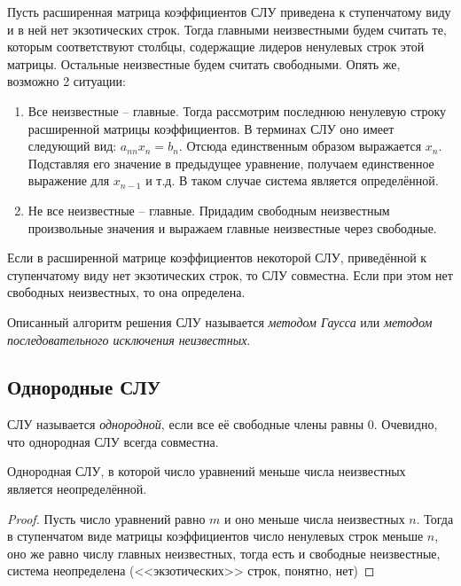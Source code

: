   Пусть расширенная матрица коэффициентов СЛУ приведена к ступенчатому виду и в ней нет экзотических строк. Тогда главными неизвестными будем считать те, которым соответствуют столбцы, содержащие лидеров ненулевых строк этой матрицы. Остальные неизвестные будем считать свободными. Опять же, возможно 2 ситуации:
  \begin{enumerate}
    \item Все неизвестные -- главные. Тогда рассмотрим последнюю ненулевую строку расширенной матрицы коэффициентов. В терминах СЛУ оно имеет следующий вид: $a_{nn}x_n = b_n$. Отсюда единственным образом выражается $x_n$. Подставляя его значение в предыдущее уравнение, получаем единственное выражение для $x_{n-1}$ и т.д. В таком случае система является определённой.
    \item Не все неизвестные -- главные. Придадим свободным неизвестным произвольные значения и выражаем главные неизвестные через свободные.
  \end{enumerate}
  
  \begin{stm}
    Если в расширенной матрице коэффициентов некоторой СЛУ, приведённой к ступенчатому виду нет экзотических строк, то СЛУ совместна. Если  при этом нет свободных неизвестных, то она определена.
  \end{stm}
  
  Описанный алгоритм решения СЛУ называется \emph{методом Гаусса} или \emph{методом последовательного исключения неизвестных}.
  
  \subsection{Однородные СЛУ}
  \label{oslu}
  
  \begin{df}
    СЛУ называется \emph{однородной}, если все её свободные члены равны 0. Очевидно, что однородная СЛУ всегда совместна.
  \end{df}
  
  \begin{theorem}
    Однородная СЛУ, в которой число уравнений меньше числа неизвестных является неопределённой.
  \end{theorem}
  \begin{proof}
    Пусть число уравнений равно $m$ и оно меньше числа неизвестных $n$. Тогда в ступенчатом виде матрицы коэффициентов число ненулевых строк меньше $n$, оно же равно числу главных неизвестных, тогда есть и свободные неизвестные, система неопределена (<<экзотических>> строк, понятно, нет)
  \end{proof}
  
